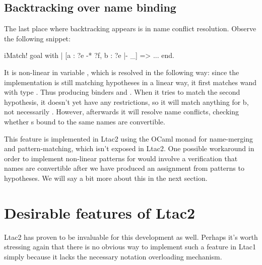 \subsection{Backtracking over name binding}

The last place where backtracking appears is in name conflict resolution.
Observe the following snippet:

\begin{coq}
iMatch! goal with
| [a : ?e -* ?f, b : ?e |- _] => ...
end.
\end{coq}

It is non-linear in variable , which is resolved in the following way:
since the implementation is still matching hypotheses in a linear way, it first matches wand  with type .
Thus producing binders  and .
When it tries to match the second hypothesis, it doesn't yet have any restrictions, so it will match anything for b, not necessarily .
However, afterwards it will resolve name conflicts, checking whether s bound to the same names are convertible.

This feature is implemented in Ltac2 using the OCaml monad for name-merging and pattern-matching, which isn't exposed in Ltac2.
One possible workaround in order to implement non-linear patterns for  would involve a verification that names are convertible after we have produced an assignment from patterns to hypotheses.
We will say a bit more about this in the next section.

\section{Desirable features of Ltac2}
\label{sec:desir-feat-ltac2-five}

Ltac2 has proven to be invaluable for this development as well.
Perhaps it's worth stressing again that there is no obvious way to implement such a feature in Ltac1 simply because it lacks the necessary notation overloading mechanism.

